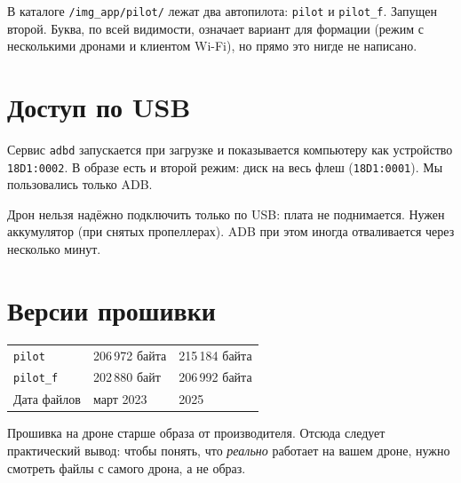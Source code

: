 \begin{zametka}
В каталоге \texttt{/img\_app/pilot/} лежат два автопилота: \texttt{pilot} и \texttt{pilot\_f}. Запущен второй. Буква, по всей видимости, означает вариант для формации (режим с несколькими дронами и клиентом Wi-Fi), но прямо это нигде не написано. \vyv{}
\end{zametka}

\section{Доступ по USB}

Сервис \texttt{adbd} запускается при загрузке и показывается компьютеру как устройство \texttt{18D1:0002}. В образе есть и второй режим: диск на весь флеш (\texttt{18D1:0001}). Мы пользовались только ADB.

\begin{opasno}[Питание]
Дрон нельзя надёжно подключить только по USB: плата не поднимается. Нужен аккумулятор (при снятых пропеллерах). ADB при этом иногда отваливается через несколько минут. \pr{}
\end{opasno}

\section{Версии прошивки}

\begin{tabularx}{\textwidth}{@{}Y p{3.2cm} p{3.2cm}@{}}
\toprule
{} &  &  \\ \midrule
\texttt{pilot} & 206\,972 байта & 215\,184 байта \\
\texttt{pilot\_f} & 202\,880 байт & 206\,992 байта \\
Дата файлов & март 2023 & 2025 \\ \bottomrule
\end{tabularx}

\vspace{4pt}
Прошивка на дроне старше образа от производителя. Отсюда следует практический вывод: чтобы понять, что \emph{реально} работает на вашем дроне, нужно смотреть файлы с самого дрона, а не образ. \pr{}
